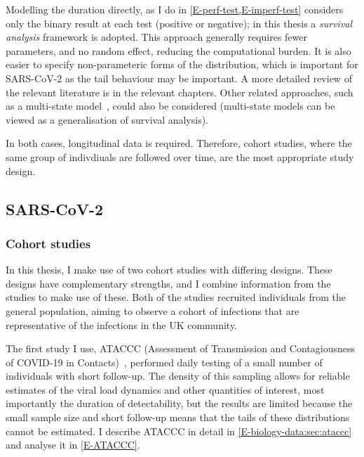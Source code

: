 \documentclass[thesis.tex]{subfiles}
\begin{document}
Modelling the duration directly, as I do in \cref{E-perf-test,E-imperf-test} considers only the binary result at each test (positive or negative); in this thesis a \emph{survival analysis} framework is adopted.
This approach generally requires fewer parameters, and no random effect, reducing the computational burden.
It is also easier to specify non-parameteric forms of the distribution, which is important for SARS-CoV-2 as the tail behaviour may be important.
A more detailed review of the relevant literature is in the relevant chapters.
Other related approaches, such as a multi-state model~\autocite{jacksonMSM}, could also be considered (multi-state models can be viewed as a generalisation of survival analysis).

In both cases, longitudinal data is required.
Therefore, cohort studies, where the same group of indivdiuals are followed over time, are the most appropriate study design.

\subsection{SARS-CoV-2} \label{intro:sec:duration-SARS-CoV-2}

\subsubsection{Cohort studies}

In this thesis, I make use of two cohort studies with differing designs.
These designs have complementary strengths, and I combine information from the studies to make use of these.
Both of the studies recruited individuals from the general population, aiming to observe a cohort of infections that are representative of the infections in the UK community.

The first study I use, ATACCC (Assessment of Transmission and Contagiousness of COVID-19 in Contacts)~\autocite{singanayagamCommunity,hakkiOnset}, performed daily testing of a small number of individuals with short follow-up.
The density of this sampling allows for reliable estimates of the viral load dynamics and other quantities of interest, most importantly the duration of detectability, but the results are limited because the small sample size and short follow-up means that the tails of these distributions cannot be estimated.
I describe ATACCC in detail in \cref{E-biology-data:sec:ataccc} and analyse it in \cref{E-ATACCC}.
\end{document}
